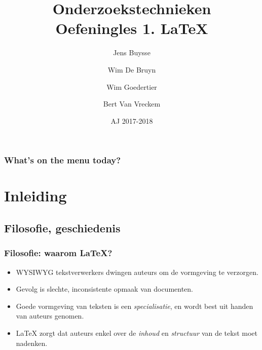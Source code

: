 \documentclass{beamer}
\title[Intro]{Onderzoekstechnieken\\Oefeningles 1. \LaTeX{}}
\author{Jens Buysse \and Wim {De Bruyn} \and Wim Goedertier \and Bert {Van Vreckem}}
\date{AJ 2017-2018}
\begin{document}

\HoGentLogo

\titleframe


\begin{frame}
  \frametitle{What's on the menu today?}

  \tableofcontents
\end{frame}

\section{Inleiding}

\subsection{Filosofie, geschiedenis}

\begin{frame}
  \frametitle{Filosofie: waarom {\LaTeX}?}
  
  \begin{itemize}
  \item<+-> WYSIWYG tekstverwerkers dwingen auteurs om de vormgeving te verzorgen.
  \item<+-> Gevolg is slechte, inconsistente opmaak van documenten.
  \item<+-> Goede vormgeving van teksten is een \emph{specialisatie}, en wordt best
    uit handen van auteurs genomen.
  \item<+-> {\LaTeX} zorgt dat auteurs enkel over de \emph{inhoud} en \emph{structuur} van de tekst moet nadenken.
  \end{itemize}
\end{frame}
\end{document}
